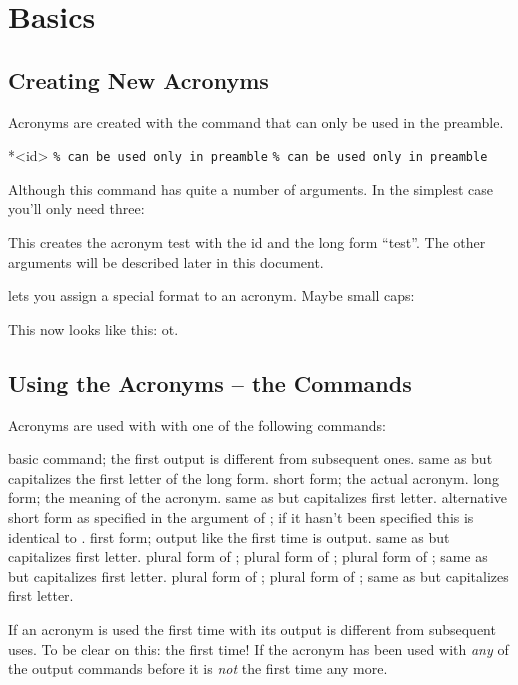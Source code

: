 \documentclass[DIV10,toc=index,toc=bib]{cnpkgdoc}
\newcommand*\h[1]{\textcolor{main}{#1}}
\begin{document}
\section{Basics}
\subsection{Creating New Acronyms}
Acronyms are created with the command  that can only be used in
the preamble.
\begin{beschreibung}
 *{<id>}
 \verb+% can be used only in preamble+
  \verb+% can be used only in preamble+
\end{beschreibung}
Although this command has quite a number of arguments. In the simplest case you'll
only need three:
\begin{beispiel}
\end{beispiel}
This creates the acronym \acs{test} with the \acs{id}  and the long form
``\acl{test}''. The other arguments will be described later in this document.

 lets you assign a special format to an acronym. Maybe
small caps:
\begin{beispiel}
\end{beispiel}
This now looks like this: \acs{ot}.

\subsection{Using the Acronyms -- the Commands}
Acronyms are used with with one of the following commands:
\begin{beschreibung}
  basic command; the first output is different from subsequent ones.
  same as  but capitalizes the first letter of the long form.
  \h{s}hort form; the actual acronym.
  \h{l}ong form; the meaning of the acronym.
  same as  but capitalizes first letter.
  \h{a}lternative short form as specified in the  argument
 of ; if it hasn't been specified this is identical to .
  first form; output like the first time  is output.
  same as  but capitalizes first letter.
  \h{p}lural form of ;
  plural form of ;
  plural form of ;
  same as  but capitalizes first letter.
  plural form of ;
  plural form of ;
  same as  but capitalizes first letter.
\end{beschreibung}
If an acronym is used the first time with  its output is different from
subsequent uses. To be clear on this: the first time! If the acronym has been
used with \emph{any} of the output commands before it is \emph{not} the first
time any more.
\end{document}
